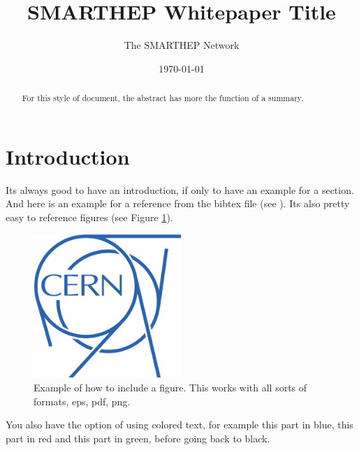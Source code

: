 \documentclass{smarthepnote}
\title{SMARTHEP Whitepaper Title}
\author{The SMARTHEP Network}
\date{\today}
\begin{document}
\maketitle

\begin{abstract}
For this style of document, the abstract has more the function of a summary. 
\end{abstract}

\vfill
\makereviewtable
\clearpage


\section{Introduction}
Its always good to have an introduction, if only to have an example for a section. And here is an example for a reference from the bibtex file (see \cite{einstein}). Its also pretty easy to reference figures (see Figure \ref{fig:examplecernlogo}). \\
\begin{figure}[ht]
\centering
\includegraphics[width=0.5\textwidth]{images/cernlogo.eps}
\caption{\label{fig:examplecernlogo} Example of how to include a figure. This works with all sorts of formats, eps, pdf, png.}
\end{figure}

\FloatBarrier


You also have the option of using colored text, for example \color{blue} this part in blue,  \color{red} this part in red  \color{green} and this part in green, before \color{black} going back to black.  
\end{document}

